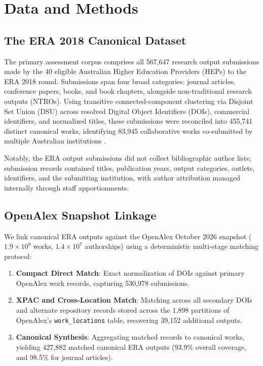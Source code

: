 \documentclass[11pt,a4paper]{article}
\begin{document}
\section{Data and Methods}

\subsection{The ERA 2018 Canonical Dataset}
The primary assessment corpus comprises all 567,647 research output submissions made by the 40 eligible Australian Higher Education Providers (HEPs) to the ERA 2018 round. Submissions span four broad categories: journal articles, conference papers, books, and book chapters, alongside non-traditional research outputs (NTROs). Using transitive connected-component clustering via Disjoint Set Union (DSU) across resolved Digital Object Identifiers (DOIs), commercial identifiers, and normalized titles, these submissions were reconciled into 455,741 distinct canonical works, identifying 83,945 collaborative works co-submitted by multiple Australian institutions \citep{cram2026bibliometric}.

Notably, the ERA output submissions did not collect bibliographic author lists; submission records contained titles, publication years, output categories, outlets, identifiers, and the submitting institution, with author attribution managed internally through staff apportionments.

\subsection{OpenAlex Snapshot Linkage}
We link canonical ERA outputs against the OpenAlex October 2026 snapshot ($1.9\times 10^8$ works, $1.4\times 10^7$ authorships) using a deterministic multi-stage matching protocol:
\begin{enumerate}
    \item \textbf{Compact Direct Match}: Exact normalization of DOIs against primary OpenAlex work records, capturing 530,978 submissions.
    \item \textbf{XPAC and Cross-Location Match}: Matching across all secondary DOIs and alternate repository records stored across the 1,898 partitions of OpenAlex's \texttt{work\_locations} table, recovering 39,152 additional outputs.
    \item \textbf{Canonical Synthesis}: Aggregating matched records to canonical works, yielding 427,882 matched canonical ERA outputs (93.9\% overall coverage, and 98.5\% for journal articles).
\end{enumerate}
\end{document}
